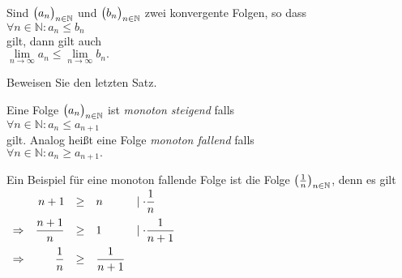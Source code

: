 \begin{Satz}
Sind $\bigl(a_n\bigr)_{n\in\mathbb{N}}$  
und $\bigl(b_n\bigr)_{n\in\mathbb{N}}$ zwei konvergente Folgen, so dass
\\[0.2cm]
\hspace*{1.3cm}
$ \forall n \in \mathbb{N}: a_n \leq b_n $
\\[0.2cm]
gilt, dann gilt auch
\\[0.2cm]
\hspace*{1.3cm}
$ \lim\limits_{n\rightarrow\infty} a_n \leq \lim\limits_{n\rightarrow\infty} b_n. $
\end{Satz}

\exercise
Beweisen Sie den letzten Satz.  \eox


\begin{Definition}[monoton]
Eine Folge $\bigl(a_n\bigr)_{n\in\mathbb{N}}$ ist \emph{monoton steigend} falls 
\\[0.2cm]
\hspace*{1.3cm}
$ \forall n \in \mathbb{N}: a_n \leq a_{n+1} $
\\[0.2cm]
gilt.  Analog hei\ss{}t eine Folge \emph{monoton fallend} falls
\\[0.2cm]
\hspace*{1.3cm}
$ \forall n \in \mathbb{N}: a_n \geq a_{n+1}. $
\eod
\end{Definition}
Ein Beispiel f\"ur eine monoton fallende Folge ist die Folge $\left(\frac{1}{n}\right)_{n\in\mathbb{N}}$, denn es
gilt
\\[0.2cm]
\hspace*{1.3cm}
$
\begin{array}{crcll}
            &  n+1          & \geq & n             & \displaystyle\mid \cdot  \frac{1}{n} \\[0.3cm]
\Rightarrow & \displaystyle\frac{n+1}{n} & \geq & 1             & \displaystyle\mid \cdot  \frac{1}{n+1}\\[0.3cm]
\Rightarrow & \displaystyle\frac{1}{n}   & \geq & \displaystyle\frac{1}{n+1} \\[0.3cm]
\end{array}
$


